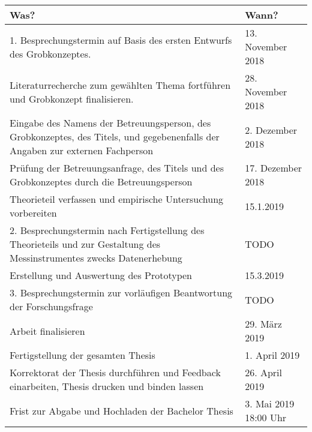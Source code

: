 \documentclass{hwz}
\begin{document}
\begin{center}
    \renewcommand{\arraystretch}{1.25}
    \setlength{\tabcolsep}{15pt}
    \begin{tabular}{ | p{8cm} | l |}
    \hline
    \rowcolor{ccc} Was? & Wann? \\ \hline
    1. Besprechungstermin auf Basis des ersten Entwurfs des Grobkonzeptes. & 13. November 2018 \\ \hline
    
    Literaturrecherche zum gewählten Thema fortführen und Grobkonzept finalisieren. & 28. November 2018 \\ \hline
    
    \rowcolor{orange} Eingabe des Namens der Betreuungsperson, des Grobkonzeptes, des Titels, und gegebenenfalls der Angaben zur externen Fachperson & 2. Dezember 2018 \\ \hline
    
    Prüfung der Betreuungsanfrage, des Titels und des Grobkonzeptes durch die Betreuungsperson & 17. Dezember 2018 \\ \hline
    
    Theorieteil verfassen und empirische Untersuchung vorbereiten & 15.1.2019 \\ \hline
    
    2. Besprechungstermin nach Fertigstellung des Theorieteils und zur Gestaltung des Messinstrumentes zwecks Datenerhebung & TODO \\ \hline
    
    Erstellung und Auswertung des Prototypen & 15.3.2019 \\ \hline
    
    3. Besprechungstermin zur vorläufigen Beantwortung der Forschungsfrage & TODO \\ \hline
    
    Arbeit finalisieren & 29. März 2019 \\ \hline
    
    Fertigstellung der gesamten Thesis & 1. April 2019 \\ \hline
    
    Korrektorat der Thesis durchführen und Feedback einarbeiten, Thesis drucken und binden lassen & 26. April 2019 \\ \hline
    
    \rowcolor{orange} Frist zur Abgabe und Hochladen der Bachelor Thesis & 3. Mai 2019 18:00 Uhr \\ \hline
    
    \end{tabular}
\end{center}
\end{document}
